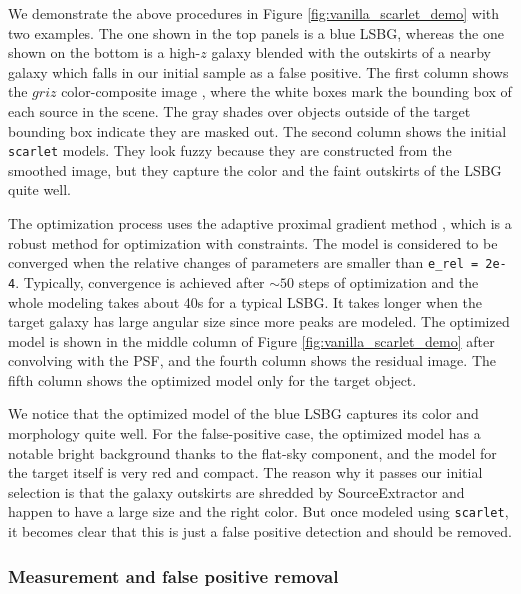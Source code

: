 \documentclass[twocolumn,astrosymb,twocolappendix]{aastex631}
\newcommand{\code}[1]{\texttt{#1}}
\begin{document}
\begin{CJK*}{UTF8}{gbsn}
We demonstrate the above procedures in Figure \ref{fig:vanilla_scarlet_demo} with two examples. The one shown in the top panels is a blue LSBG, whereas the one shown on the bottom is a high-$z$ galaxy blended with the outskirts of a nearby galaxy which falls in our initial sample as a false positive. The first column shows the $griz$ color-composite image \citep{Lupton2004}, where the white boxes mark the bounding box of each source in the scene. The gray shades over objects outside of the target bounding box indicate they are masked out. The second column shows the initial \code{scarlet} models. They look fuzzy because they are constructed from the smoothed image, but they capture the color and the faint outskirts of the LSBG quite well. 

The optimization process uses the adaptive proximal gradient method \citep{Melchior2019}, which is a robust method for optimization with constraints. The model is considered to be converged when the relative changes of parameters are smaller than \code{e\_rel\,=\,2e-4}. Typically, convergence is achieved after $\sim 50$ steps of optimization and the whole modeling takes about 40s for a typical LSBG. It takes longer when the target galaxy has large angular size since more peaks are modeled. The optimized model is shown in the middle column of Figure \ref{fig:vanilla_scarlet_demo} after convolving with the PSF, and the fourth column shows the residual image. The fifth column shows the optimized model only for the target object. 

We notice that the optimized model of the blue LSBG captures its color and morphology quite well. For the false-positive case, the optimized model has a notable bright background thanks to the flat-sky component, and the model for the target itself is very red and compact. The reason why it passes our initial selection is that the galaxy outskirts are shredded by SourceExtractor and happen to have a large size and the right color. But once modeled using \code{scarlet}, it becomes clear that this is just a false positive detection and should be removed. 


\subsubsection{Measurement and false positive removal}\label{sec:non-par-measurement}


\end{CJK*}
\end{document}
